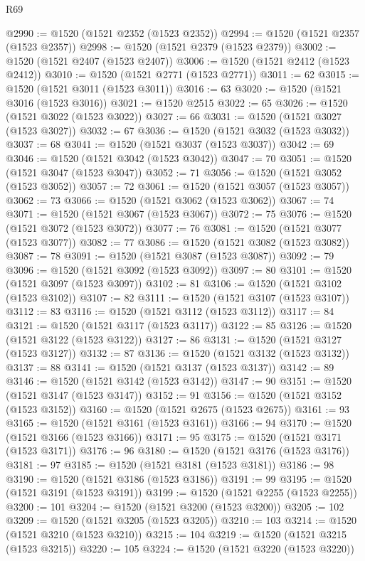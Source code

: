 \begin{lexlean}{R69}
\begin{coremodule}
{@2990 := @1520 (@1521 @2352 (@1523 @2352))
@2994 := @1520 (@1521 @2357 (@1523 @2357))
@2998 := @1520 (@1521 @2379 (@1523 @2379))
@3002 := @1520 (@1521 @2407 (@1523 @2407))
@3006 := @1520 (@1521 @2412 (@1523 @2412))
@3010 := @1520 (@1521 @2771 (@1523 @2771))
@3011 := 62
@3015 := @1520 (@1521 @3011 (@1523 @3011))
@3016 := 63
@3020 := @1520 (@1521 @3016 (@1523 @3016))
@3021 := @1520 @2515
@3022 := 65
@3026 := @1520 (@1521 @3022 (@1523 @3022))
@3027 := 66
@3031 := @1520 (@1521 @3027 (@1523 @3027))
@3032 := 67
@3036 := @1520 (@1521 @3032 (@1523 @3032))
@3037 := 68
@3041 := @1520 (@1521 @3037 (@1523 @3037))
@3042 := 69
@3046 := @1520 (@1521 @3042 (@1523 @3042))
@3047 := 70
@3051 := @1520 (@1521 @3047 (@1523 @3047))
@3052 := 71
@3056 := @1520 (@1521 @3052 (@1523 @3052))
@3057 := 72
@3061 := @1520 (@1521 @3057 (@1523 @3057))
@3062 := 73
@3066 := @1520 (@1521 @3062 (@1523 @3062))
@3067 := 74
@3071 := @1520 (@1521 @3067 (@1523 @3067))
@3072 := 75
@3076 := @1520 (@1521 @3072 (@1523 @3072))
@3077 := 76
@3081 := @1520 (@1521 @3077 (@1523 @3077))
@3082 := 77
@3086 := @1520 (@1521 @3082 (@1523 @3082))
@3087 := 78
@3091 := @1520 (@1521 @3087 (@1523 @3087))
@3092 := 79
@3096 := @1520 (@1521 @3092 (@1523 @3092))
@3097 := 80
@3101 := @1520 (@1521 @3097 (@1523 @3097))
@3102 := 81
@3106 := @1520 (@1521 @3102 (@1523 @3102))
@3107 := 82
@3111 := @1520 (@1521 @3107 (@1523 @3107))
@3112 := 83
@3116 := @1520 (@1521 @3112 (@1523 @3112))
@3117 := 84
@3121 := @1520 (@1521 @3117 (@1523 @3117))
@3122 := 85
@3126 := @1520 (@1521 @3122 (@1523 @3122))
@3127 := 86
@3131 := @1520 (@1521 @3127 (@1523 @3127))
@3132 := 87
@3136 := @1520 (@1521 @3132 (@1523 @3132))
@3137 := 88
@3141 := @1520 (@1521 @3137 (@1523 @3137))
@3142 := 89
@3146 := @1520 (@1521 @3142 (@1523 @3142))
@3147 := 90
@3151 := @1520 (@1521 @3147 (@1523 @3147))
@3152 := 91
@3156 := @1520 (@1521 @3152 (@1523 @3152))
@3160 := @1520 (@1521 @2675 (@1523 @2675))
@3161 := 93
@3165 := @1520 (@1521 @3161 (@1523 @3161))
@3166 := 94
@3170 := @1520 (@1521 @3166 (@1523 @3166))
@3171 := 95
@3175 := @1520 (@1521 @3171 (@1523 @3171))
@3176 := 96
@3180 := @1520 (@1521 @3176 (@1523 @3176))
@3181 := 97
@3185 := @1520 (@1521 @3181 (@1523 @3181))
@3186 := 98
@3190 := @1520 (@1521 @3186 (@1523 @3186))
@3191 := 99
@3195 := @1520 (@1521 @3191 (@1523 @3191))
@3199 := @1520 (@1521 @2255 (@1523 @2255))
@3200 := 101
@3204 := @1520 (@1521 @3200 (@1523 @3200))
@3205 := 102
@3209 := @1520 (@1521 @3205 (@1523 @3205))
@3210 := 103
@3214 := @1520 (@1521 @3210 (@1523 @3210))
@3215 := 104
@3219 := @1520 (@1521 @3215 (@1523 @3215))
@3220 := 105
@3224 := @1520 (@1521 @3220 (@1523 @3220))
}
\end{coremodule}
\end{lexlean}
